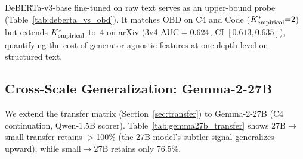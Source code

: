 DeBERTa-v3-base fine-tuned on raw text serves as an upper-bound probe (Table~\ref{tab:deberta_vs_obd}).
It matches OBD on C4 and Code (${K^*_{\text{empirical}}}{=}2$) but extends $\Kempirical$ to~4 on arXiv (3v4 $\text{AUC} = 0.624$, CI $[0.613, 0.635]$), quantifying the cost of generator-agnostic features at one depth level on structured text.

\begin{table}[H]
\centering
\caption{$\Kempirical$ comparison: OBD (15D) vs.\ DeBERTa-v3-base (Qwen2.5-1.5B base, continuation mode; $\theta{=}0.60$).}
\label{tab:deberta_vs_obd}
\footnotesize
{}
\end{table}

\subsection{Cross-Scale Generalization: Gemma-2-27B}
\label{sec:gemma27b_transfer}
\label{sec:gemma27b_filtering}

We extend the transfer matrix (Section~\ref{sec:transfer}) to Gemma-2-27B (C4 continuation, Qwen-1.5B scorer).
Table~\ref{tab:gemma27b_transfer} shows 27B$\to$small transfer retains $>$100\% (the 27B model's subtler signal generalizes upward), while small$\to$27B retains only 76.5\%.

\begin{table}[H]
\centering
\small
\caption{Cross-scale transfer retention (\%) between Gemma-2-27B and 1B--8B models.}
\label{tab:gemma27b_transfer}
\end{table}

